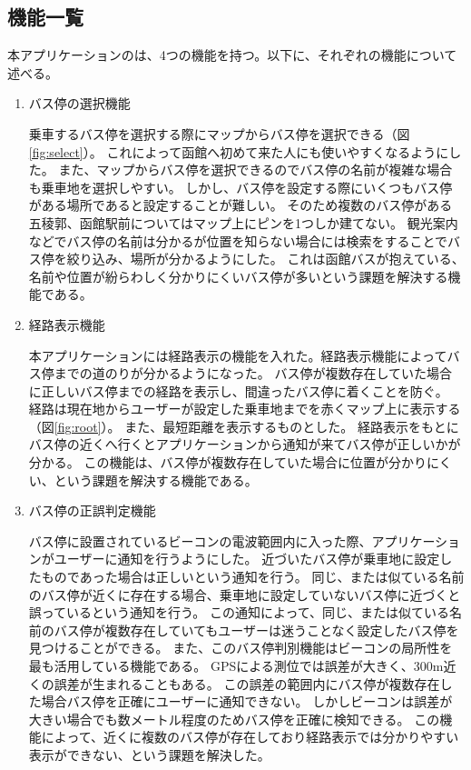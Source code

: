 \documentclass[openany,11pt,papersize]{jsbook}
\begin{document}
\subsection{機能一覧}
本アプリケーションのは、4つの機能を持つ。以下に、それぞれの機能について述べる。
\begin{enumerate}

\item バス停の選択機能\mbox{}

乗車するバス停を選択する際にマップからバス停を選択できる（図\ref{fig:select}）。
これによって函館へ初めて来た人にも使いやすくなるようにした。
また、マップからバス停を選択できるのでバス停の名前が複雑な場合も乗車地を選択しやすい。
しかし、バス停を設定する際にいくつもバス停がある場所であると設定することが難しい。
そのため複数のバス停がある五稜郭、函館駅前についてはマップ上にピンを1つしか建てない。
観光案内などでバス停の名前は分かるが位置を知らない場合には検索をすることでバス停を絞り込み、場所が分かるようにした。
これは函館バスが抱えている、名前や位置が紛らわしく分かりにくいバス停が多いという課題を解決する機能である。

\item 経路表示機能\mbox{}

本アプリケーションには経路表示の機能を入れた。経路表示機能によってバス停までの道のりが分かるようになった。
バス停が複数存在していた場合に正しいバス停までの経路を表示し、間違ったバス停に着くことを防ぐ。
経路は現在地からユーザーが設定した乗車地までを赤くマップ上に表示する（図\ref{fig:root}）。
また、最短距離を表示するものとした。
経路表示をもとにバス停の近くへ行くとアプリケーションから通知が来てバス停が正しいかが分かる。
この機能は、バス停が複数存在していた場合に位置が分かりにくい、という課題を解決する機能である。

\item バス停の正誤判定機能\mbox{}

バス停に設置されているビーコンの電波範囲内に入った際、アプリケーションがユーザーに通知を行うようにした。
近づいたバス停が乗車地に設定したものであった場合は正しいという通知を行う。
同じ、または似ている名前のバス停が近くに存在する場合、乗車地に設定していないバス停に近づくと誤っているという通知を行う。
この通知によって、同じ、または似ている名前のバス停が複数存在していてもユーザーは迷うことなく設定したバス停を見つけることができる。
また、このバス停判別機能はビーコンの局所性を最も活用している機能である。
GPSによる測位では誤差が大きく、300m近くの誤差が生まれることもある。
この誤差の範囲内にバス停が複数存在した場合バス停を正確にユーザーに通知できない。
しかしビーコンは誤差が大きい場合でも数メートル程度のためバス停を正確に検知できる。
この機能によって、近くに複数のバス停が存在しており経路表示では分かりやすい表示ができない、という課題を解決した。


\end{enumerate}
\end{document}
